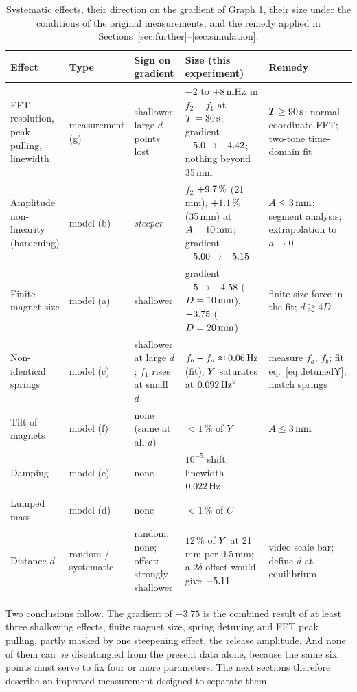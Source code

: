 \begin{table}[htbp]
\centering\footnotesize
\caption{Systematic effects, their direction on the gradient of Graph 1, their size under the conditions of the original measurements, and the remedy applied in Sections~\ref{sec:further}--\ref{sec:simulation}.}
\label{tab:errsummary}
\setlength{\tabcolsep}{4pt}
\renewcommand{\arraystretch}{1.15}
\begin{tabular}{@{}>{\raggedright\arraybackslash}p{2.6cm}>{\raggedright\arraybackslash}p{1.9cm}>{\raggedright\arraybackslash}p{3.0cm}>{\raggedright\arraybackslash}p{4.0cm}>{\raggedright\arraybackslash}p{3.5cm}@{}}
\toprule
Effect & Type & Sign on gradient & Size (this experiment) & Remedy\\
\midrule
FFT resolution, peak pulling, linewidth & measurement (g) & shallower; large-$d$ points lost & $+2$ to $+8\,\mathrm{mHz}$ in $f_2-f_1$ at $T=30\,\mathrm{s}$; gradient $-5.0\to-4.42$; nothing beyond 35\,mm & $T\geq90\,\mathrm{s}$; normal-coordinate FFT; two-tone time-domain fit\\[2pt]
Amplitude non-linearity (hardening) & model (b) & \emph{steeper} & $f_2$ $+9.7\,\%$ (21\,mm), $+1.1\,\%$ (35\,mm) at $A=10\,\mathrm{mm}$; gradient $-5.00\to-5.15$ & $A\leq3\,\mathrm{mm}$; segment analysis; extrapolation to $a\to0$\\[2pt]
Finite magnet size & model (a) & shallower & gradient $-5\to-4.58$ ($D=10\,\mathrm{mm}$), $-3.75$ ($D=20\,\mathrm{mm}$) & finite-size force in the fit; $d\gtrsim4D$\\[2pt]
Non-identical springs & model (c) & shallower at large $d$; $f_1$ rises at small $d$ & $f_b-f_a\approx0.06\,\mathrm{Hz}$ (fit); $Y$ saturates at $0.092\,\mathrm{Hz^2}$ & measure $f_a$, $f_b$; fit eq.~\eqref{eq:detunedY}; match springs\\[2pt]
Tilt of magnets & model (f) & none (same at all $d$) & $<1\,\%$ of $Y$ & $A\leq3\,\mathrm{mm}$\\[2pt]
Damping & model (e) & none & $10^{-5}$ shift; linewidth $0.022\,\mathrm{Hz}$ & --\\[2pt]
Lumped mass & model (d) & none & $<1\,\%$ of $C$ & --\\[2pt]
Distance $d$ & random / systematic & random: none; offset: strongly shallower & $12\,\%$ of $Y$ at 21\,mm per 0.5\,mm; a $2\delta$ offset would give $-5.11$ & video scale bar; define $d$ at equilibrium\\
\bottomrule
\end{tabular}
\end{table}

Two conclusions follow. The gradient of $-3.75$ is the combined result of at least three shallowing effects, finite magnet size, spring detuning and FFT peak pulling, partly masked by one steepening effect, the release amplitude. And none of them can be disentangled from the present data alone, because the same six points must serve to fix four or more parameters. The next sections therefore describe an improved measurement designed to separate them.
